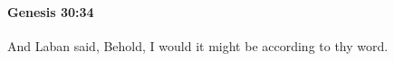 
		\paragraph{Genesis 30:34} %
			\label{GENESIS-30-34}

			And Laban said, Behold, I would it might be according to thy word.



